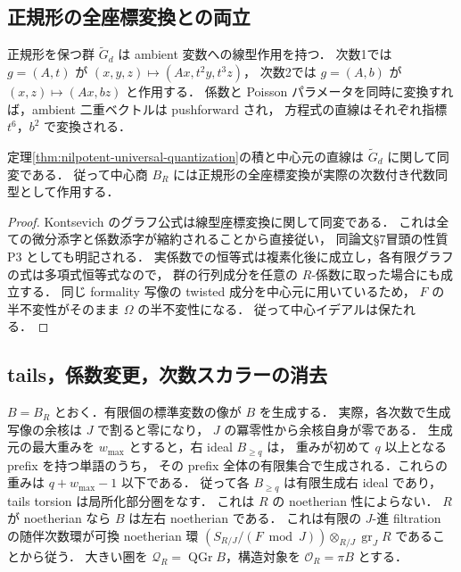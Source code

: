 \subsection{正規形の全座標変換との両立}

正規形を保つ群 $\widetilde G_d$ は ambient 変数への線型作用を持つ．
次数1では $g=(A,t)$ が $(x,y,z)\mapsto(Ax,t^2y,t^3z)$，
次数2では $g=(A,b)$ が $(x,z)\mapsto(Ax,bz)$ と作用する．
係数と Poisson パラメータを同時に変換すれば，ambient 二重ベクトルは pushforward され，
方程式の直線はそれぞれ指標 $t^6$，$b^2$ で変換される．

\begin{proposition}[厳密な同変性]
\label{prop:quantization-linear-equivariance}
定理\ref{thm:nilpotent-universal-quantization}の積と中心元の直線は
$\widetilde G_d$ に関して同変である．
従って中心商 $B_R$ には正規形の全座標変換が実際の次数付き代数同型として作用する．
\end{proposition}
\begin{proof}
Kontsevich のグラフ公式は線型座標変換に関して同変である．
これは全ての微分添字と係数添字が縮約されることから直接従い，
同論文\S7冒頭の性質 P3 としても明記される\cite[\S7，P3]{Kontsevich}．
実係数での恒等式は複素化後に成立し，各有限グラフの式は多項式恒等式なので，
群の行列成分を任意の $R$-係数に取った場合にも成立する．
同じ formality 写像の twisted 成分を中心元に用いているため，
$F$ の半不変性がそのまま $\Omega$ の半不変性になる．
従って中心イデアルは保たれる．
\end{proof}

\subsection{tails，係数変更，次数スカラーの消去}

$B=B_R$ とおく．有限個の標準変数の像が $B$ を生成する．
実際，各次数で生成写像の余核は $J$ で割ると零になり，
$J$ の冪零性から余核自身が零である．
生成元の最大重みを $w_{\max}$ とすると，右 ideal $B_{\ge q}$ は，
重みが初めて $q$ 以上となる prefix を持つ単語のうち，
その prefix 全体の有限集合で生成される．これらの重みは $q+w_{\max}-1$ 以下である．
従って各 $B_{\ge q}$ は有限生成右 ideal であり，tails torsion は局所化部分圏をなす．
これは $R$ の noetherian 性によらない．
$R$ が noetherian なら $B$ は左右 noetherian である．
これは有限の $J$-進 filtration の随伴次数環が可換 noetherian 環
$(S_{R/J}/(F\bmod J))\otimes_{R/J}\operatorname{gr}_J R$ であることから従う．
大きい圏を $\mathcal Q_R=\operatorname{QGr}B$，構造対象を
$\mathcal O_R=\pi B$ とする．

